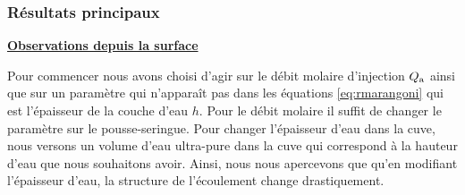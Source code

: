 \documentclass[french, 10pt]{article}
\begin{document}
% 
% 
\subsubsection{Résultats principaux}

\noindent\underline{\textbf{Observations depuis la surface}}\medskip

Pour commencer nous avons choisi d'agir sur le débit molaire d'injection $Q_{\rm a}$ ainsi que sur un paramètre qui n'apparaît pas dans les équations \eqref{eq:rmarangoni} qui est l'épaisseur de la couche d'eau $h$. Pour le débit molaire il suffit de changer le paramètre sur le pousse-seringue. Pour changer l'épaisseur d'eau dans la cuve, nous versons un volume d'eau ultra-pure dans la cuve qui correspond à la hauteur d'eau que nous souhaitons avoir. Ainsi, nous nous apercevons que qu'en modifiant l'épaisseur d'eau, la structure de l'écoulement change drastiquement.\medskip
\end{document}
